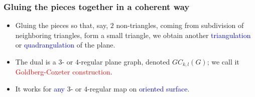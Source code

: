 \documentclass{beamer}
\begin{document}
\begin{frame}\frametitle{Gluing the pieces together in a coherent way}
\vspace{-2.5mm}
\begin{itemize}
\item Gluing the pieces so that, say, $2$ non-triangles, coming from  
subdivision 
of neighboring triangles, form a small triangle,
we obtain 
another \textcolor{blue}{triangulation} or 
\textcolor{blue}{quadrangulation} of the plane.
\end{itemize}
\begin{center}
\centering
{}
\end{center}   
\begin{itemize} 
\item The dual is  a $3$- or $4$-regular plane graph,  
 denoted $GC_{k,l}(G)$; we call it \textcolor{red}{Goldberg-Coxeter construction}.
\item It 
works for \textcolor{blue}{any} $3$- or $4$-regular  map on 
\textcolor{blue}{oriented surface}.
\end{itemize}  
\end{frame}
\end{document}
